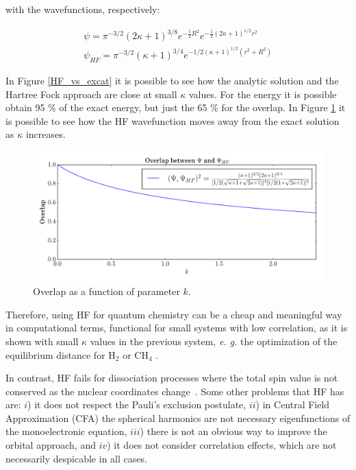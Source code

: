 \noindent with the wavefunctions, respectively:

\begin{align}
\psi = \pi^{-3/2} (2\kappa +1)^{3/8} e^{-\frac12 R^2} e^{-\frac12(2\kappa+1)^{1/2}r^2} \\\nonumber
\psi_{HF} = \pi^{-3/2}(\kappa +1)^{3/4} e^{-1/2(\kappa +1)^{1/2}(r^2+R^2)}
\end{align}

In Figure \ref{HF_vs_excat} it is possible to see how the analytic solution
and the Hartree Fock approach are close at small $\kappa$ values. For
the energy it is possible obtain 95 \% of the exact energy, but just the 65 \%
for the overlap. In Figure \ref{HF_vs_psi} it is possible to see how the
HF wavefunction moves away from the exact solution as $\kappa$ increases.


\begin{figure}
  \centering
  \includegraphics[width=1\textwidth]{3/img/HF_vs_psi.pdf}
  \caption{Overlap as a function of parameter $k$.}
\label{HF_vs_psi}
\end{figure}

Therefore, using HF for quantum chemistry can be a cheap and meaningful way in
computational terms, functional for small systems with low correlation,
as it is shown with small $\kappa$ values in the previous system, \textit{e.
g.} the optimization of the equilibrium distance for H$_2$ or CH$_4$
\cite{defrees1982effect}.

\pagebreak

In contrast, HF fails for dissociation processes where the total spin value is
not conserved as the nuclear coordinates change~\cite{JimnezHoyos2012}.  Some
other problems that HF has are: $i$) it does not respect the Pauli's exclusion
postulate, $ii$) in Central Field Approximation (\gls{CFA}) the spherical
harmonics are not necessary eigenfunctions of the monoelectronic equation,
$iii$) there is not an obvious way to improve the orbital approach, and $iv$)
it does not consider correlation effects, which are not necessarily despicable
in all cases.


